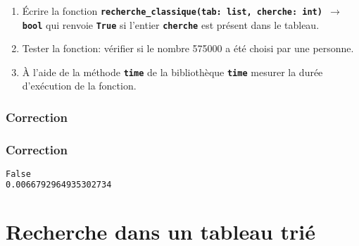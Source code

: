 \documentclass[svgnames,11pt]{beamer}
\begin{document}
\begin{frame}
    \frametitle{}

    \begin{activite}
        \begin{enumerate}
            \item Écrire la fonction \textbf{\texttt{recherche\_classique(tab: list, cherche: int) $\rightarrow$ bool}} qui renvoie \textbf{\texttt{True}} si l'entier \textbf{\texttt{cherche}} est présent dans le tableau.
            \item Tester la fonction: vérifier si le nombre 575000 a été choisi par une personne.
            \item À l'aide de la méthode \textbf{\texttt{time}} de la bibliothèque \textbf{\texttt{time}} mesurer la durée d'exécution de la fonction.
        \end{enumerate}
    \end{activite} 

\end{frame}
\begin{frame}
    \frametitle{Correction}

    

\end{frame}
\begin{frame}[fragile]
    \frametitle{Correction}

    
\begin{center}
\begin{lstlisting}[language=Bash , basicstyle=\small, xleftmargin=2em, xrightmargin=2em]
False
0.0066792964935302734
\end{lstlisting}
\end{center}
\end{frame}
\section{Recherche dans un tableau trié}
\end{document}
